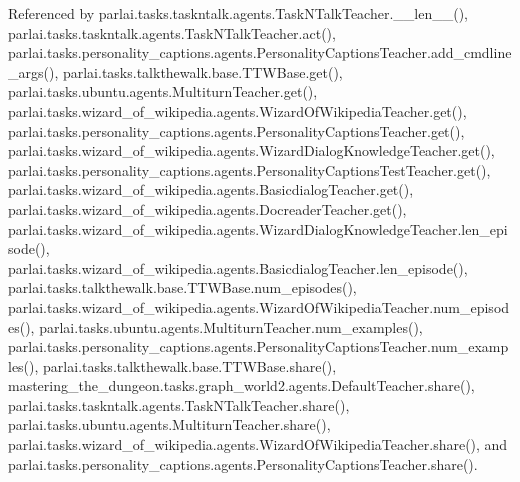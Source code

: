 Referenced by parlai.\+tasks.\+taskntalk.\+agents.\+Task\+N\+Talk\+Teacher.\+\_\+\+\_\+len\+\_\+\+\_\+(), parlai.\+tasks.\+taskntalk.\+agents.\+Task\+N\+Talk\+Teacher.\+act(), parlai.\+tasks.\+personality\+\_\+captions.\+agents.\+Personality\+Captions\+Teacher.\+add\+\_\+cmdline\+\_\+args(), parlai.\+tasks.\+talkthewalk.\+base.\+T\+T\+W\+Base.\+get(), parlai.\+tasks.\+ubuntu.\+agents.\+Multiturn\+Teacher.\+get(), parlai.\+tasks.\+wizard\+\_\+of\+\_\+wikipedia.\+agents.\+Wizard\+Of\+Wikipedia\+Teacher.\+get(), parlai.\+tasks.\+personality\+\_\+captions.\+agents.\+Personality\+Captions\+Teacher.\+get(), parlai.\+tasks.\+wizard\+\_\+of\+\_\+wikipedia.\+agents.\+Wizard\+Dialog\+Knowledge\+Teacher.\+get(), parlai.\+tasks.\+personality\+\_\+captions.\+agents.\+Personality\+Captions\+Test\+Teacher.\+get(), parlai.\+tasks.\+wizard\+\_\+of\+\_\+wikipedia.\+agents.\+Basicdialog\+Teacher.\+get(), parlai.\+tasks.\+wizard\+\_\+of\+\_\+wikipedia.\+agents.\+Docreader\+Teacher.\+get(), parlai.\+tasks.\+wizard\+\_\+of\+\_\+wikipedia.\+agents.\+Wizard\+Dialog\+Knowledge\+Teacher.\+len\+\_\+episode(), parlai.\+tasks.\+wizard\+\_\+of\+\_\+wikipedia.\+agents.\+Basicdialog\+Teacher.\+len\+\_\+episode(), parlai.\+tasks.\+talkthewalk.\+base.\+T\+T\+W\+Base.\+num\+\_\+episodes(), parlai.\+tasks.\+wizard\+\_\+of\+\_\+wikipedia.\+agents.\+Wizard\+Of\+Wikipedia\+Teacher.\+num\+\_\+episodes(), parlai.\+tasks.\+ubuntu.\+agents.\+Multiturn\+Teacher.\+num\+\_\+examples(), parlai.\+tasks.\+personality\+\_\+captions.\+agents.\+Personality\+Captions\+Teacher.\+num\+\_\+examples(), parlai.\+tasks.\+talkthewalk.\+base.\+T\+T\+W\+Base.\+share(), mastering\+\_\+the\+\_\+dungeon.\+tasks.\+graph\+\_\+world2.\+agents.\+Default\+Teacher.\+share(), parlai.\+tasks.\+taskntalk.\+agents.\+Task\+N\+Talk\+Teacher.\+share(), parlai.\+tasks.\+ubuntu.\+agents.\+Multiturn\+Teacher.\+share(), parlai.\+tasks.\+wizard\+\_\+of\+\_\+wikipedia.\+agents.\+Wizard\+Of\+Wikipedia\+Teacher.\+share(), and parlai.\+tasks.\+personality\+\_\+captions.\+agents.\+Personality\+Captions\+Teacher.\+share().

\mbox{\label{classparlai_1_1tasks_1_1personality__captions_1_1agents_1_1PersonalityCaptionsTeacher_a089a4cf3f970ddeaba4d0dfdf385008b}} 
